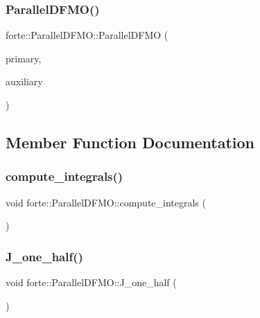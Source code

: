 \subsubsection{\texorpdfstring{Parallel\+D\+F\+M\+O()}{ParallelDFMO()}}
{\footnotesize\ttfamily forte\+::\+Parallel\+D\+F\+M\+O\+::\+Parallel\+D\+F\+MO (\begin{DoxyParamCaption}\item[{std\+::shared\+\_\+ptr$<$ psi\+::\+Basis\+Set $>$}]{primary,  }\item[{std\+::shared\+\_\+ptr$<$ psi\+::\+Basis\+Set $>$}]{auxiliary }\end{DoxyParamCaption})}



\subsection{Member Function Documentation}
\mbox{\label{classforte_1_1_parallel_d_f_m_o_a30e08d02f18b1015ce306228aab04ec3}} 
\subsubsection{\texorpdfstring{compute\+\_\+integrals()}{compute\_integrals()}}
{\footnotesize\ttfamily void forte\+::\+Parallel\+D\+F\+M\+O\+::compute\+\_\+integrals (\begin{DoxyParamCaption}{ }\end{DoxyParamCaption})}

\mbox{\label{classforte_1_1_parallel_d_f_m_o_a629322edbef4052935334ae9a5171da9}} 
\subsubsection{\texorpdfstring{J\+\_\+one\+\_\+half()}{J\_one\_half()}}
{\footnotesize\ttfamily void forte\+::\+Parallel\+D\+F\+M\+O\+::\+J\+\_\+one\+\_\+half (\begin{DoxyParamCaption}{ }\end{DoxyParamCaption})\hspace{0.3cm}{\ttfamily [protected]}}



